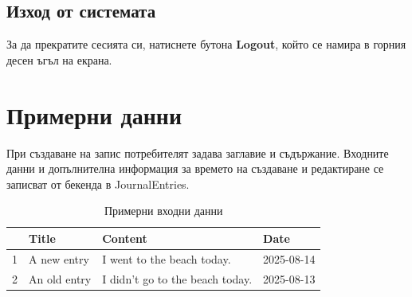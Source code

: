 \documentclass[12pt]{article}
\begin{document}
\subsection{Изход от системата}
За да прекратите сесията си, натиснете бутона \textbf{Logout}, който се намира в горния десен ъгъл на екрана.

\medskip

\section{Примерни данни}

При създаване на запис потребителят задава заглавие и съдържание. Входните данни и допълнителна информация за времето на създаване и редактиране се записват от бекенда в JournalEntries.

\begin{table}[H]
\centering
\caption{Примерни входни данни}
\begin{tabular}{ |l|l|l|l| }
 \hline
 \textbf{} & \textbf{Title} & \textbf{Content} & \textbf{Date} \\ \hline
 1 & A new entry & I went to the beach today. & 2025-08-14 \\ \hline
 2 & An old entry & I didn't go to the beach today. & 2025-08-13 \\ 
 \hline
\end{tabular}
\end{table}

\begin{table}[H]
    \caption{Примерно съдържание на JournalEntries}
    \centering
\end{table}
\end{document}
